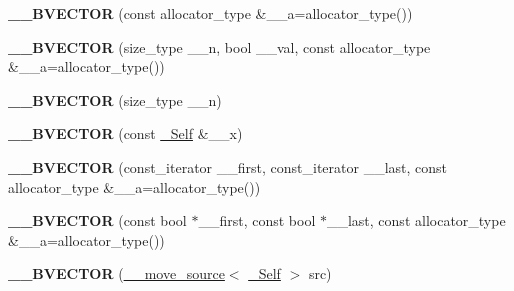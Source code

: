 \begin{DoxyCompactItemize}
\item 
\mbox{\label{class_____b_v_e_c_t_o_r___q_u_a_l_i_f_i_e_d_a9e4980d6082065561f83be3dec8b85e1}} 
{\bfseries \+\_\+\+\_\+\+B\+V\+E\+C\+T\+OR} (const allocator\+\_\+type \&\+\_\+\+\_\+a=allocator\+\_\+type())
\item 
\mbox{\label{class_____b_v_e_c_t_o_r___q_u_a_l_i_f_i_e_d_a5e3adc986179de6afccfa34967d4e65c}} 
{\bfseries \+\_\+\+\_\+\+B\+V\+E\+C\+T\+OR} (size\+\_\+type \+\_\+\+\_\+n, bool \+\_\+\+\_\+val, const allocator\+\_\+type \&\+\_\+\+\_\+a=allocator\+\_\+type())
\item 
\mbox{\label{class_____b_v_e_c_t_o_r___q_u_a_l_i_f_i_e_d_a130d3f284c6a54aea902e3928ed9a823}} 
{\bfseries \+\_\+\+\_\+\+B\+V\+E\+C\+T\+OR} (size\+\_\+type \+\_\+\+\_\+n)
\item 
\mbox{\label{class_____b_v_e_c_t_o_r___q_u_a_l_i_f_i_e_d_a5eeaf337fc020e7509c927d1b9d99857}} 
{\bfseries \+\_\+\+\_\+\+B\+V\+E\+C\+T\+OR} (const \hyperlink{class_____b_v_e_c_t_o_r___q_u_a_l_i_f_i_e_d}{\+\_\+\+Self} \&\+\_\+\+\_\+x)
\item 
\mbox{\label{class_____b_v_e_c_t_o_r___q_u_a_l_i_f_i_e_d_a830e0f37fbf20bfe8bffa2b1466e254c}} 
{\bfseries \+\_\+\+\_\+\+B\+V\+E\+C\+T\+OR} (const\+\_\+iterator \+\_\+\+\_\+first, const\+\_\+iterator \+\_\+\+\_\+last, const allocator\+\_\+type \&\+\_\+\+\_\+a=allocator\+\_\+type())
\item 
\mbox{\label{class_____b_v_e_c_t_o_r___q_u_a_l_i_f_i_e_d_a0df6c136a34d9385faf93a1238bb91b8}} 
{\bfseries \+\_\+\+\_\+\+B\+V\+E\+C\+T\+OR} (const bool $\ast$\+\_\+\+\_\+first, const bool $\ast$\+\_\+\+\_\+last, const allocator\+\_\+type \&\+\_\+\+\_\+a=allocator\+\_\+type())
\item 
\mbox{\label{class_____b_v_e_c_t_o_r___q_u_a_l_i_f_i_e_d_ab5750b65f0ca3b1d7238f12e019c62c2}} 
{\bfseries \+\_\+\+\_\+\+B\+V\+E\+C\+T\+OR} (\hyperlink{class____move__source}{\+\_\+\+\_\+move\+\_\+source}$<$ \hyperlink{class_____b_v_e_c_t_o_r___q_u_a_l_i_f_i_e_d}{\+\_\+\+Self} $>$ src)

\end{DoxyCompactItemize}

